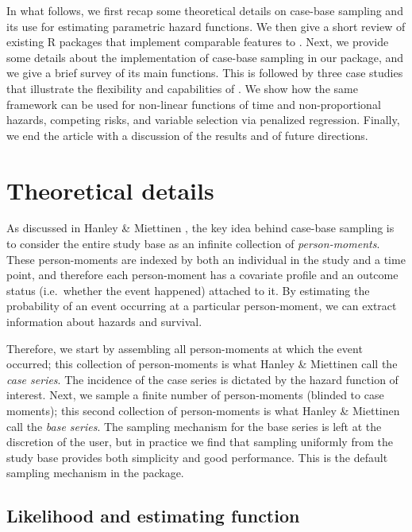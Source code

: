 In what follows, we first recap some theoretical details on case-base
sampling and its use for estimating parametric hazard functions. We then
give a short review of existing R packages that implement comparable
features to . Next, we provide some details about the
implementation of case-base sampling in our package, and we give a brief
survey of its main functions. This is followed by three case studies
that illustrate the flexibility and capabilities of . We
show how the same framework can be used for non-linear functions of time
and non-proportional hazards, competing risks, and variable selection
via penalized regression. Finally, we end the article with a discussion
of the results and of future directions.

\hypertarget{theory}{%
\section{Theoretical details}\label{theory}}

As discussed in Hanley \& Miettinen \citeyearpar{hanley2009fitting}, the
key idea behind case-base sampling is to consider the entire study base
as an infinite collection of \emph{person-moments}. These person-moments
are indexed by both an individual in the study and a time point, and
therefore each person-moment has a covariate profile and an outcome
status (i.e.~whether the event happened) attached to it. By estimating
the probability of an event occurring at a particular person-moment, we
can extract information about hazards and survival.

Therefore, we start by assembling all person-moments at which the event
occurred; this collection of person-moments is what Hanley \& Miettinen
call the \emph{case series}. The incidence of the case series is
dictated by the hazard function of interest. Next, we sample a finite
number of person-moments (blinded to case moments); this second
collection of person-moments is what Hanley \& Miettinen call the
\emph{base series}. The sampling mechanism for the base series is left
at the discretion of the user, but in practice we find that sampling
uniformly from the study base provides both simplicity and good
performance. This is the default sampling mechanism in the package.

\hypertarget{likelihood-and-estimating-function}{%
\subsection{Likelihood and estimating
function}\label{likelihood-and-estimating-function}}

